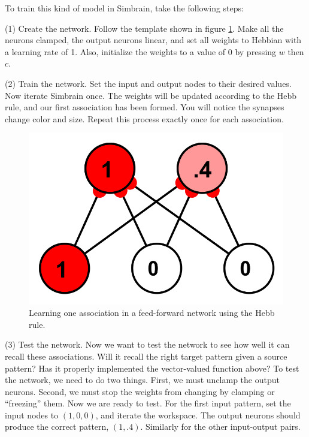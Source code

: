 To train this kind of model in Simbrain, take the following steps:

(1) Create the network. Follow the template shown in figure \ref{ffAssociator}. Make all the neurons clamped, the output neurons linear, and set all weights to Hebbian with a learning rate of 1. Also, initialize the weights to a value of 0 by pressing $w$ then $c$. 

(2) Train the network. Set the input and output nodes to their desired values. Now iterate Simbrain once. The weights will be updated according to the Hebb rule, and our first association has been formed. You will notice the synapses change color and size. Repeat this process exactly once for each association.

\begin{figure}[h]
\centering
\includegraphics[scale=.4]{./images/net-3-2.png}
\caption[Simbrain screenshot.]{Learning one association in a feed-forward network using the Hebb rule.}
\label{ffAssociator}
\end{figure}

(3) Test the network. Now we want to test the network to see how well it can recall these associations. Will it recall the right target pattern given a source pattern? Has it properly implemented the vector-valued function above?  To test the network, we need to do two things. First, we must unclamp the output neurons. Second, we must stop the weights from changing by clamping or ``freezing'' them. Now we are ready to test. For the first input pattern, set the input nodes to $(1,0,0)$, and iterate the workspace. The output neurons should produce the correct pattern, $(1, .4)$. Similarly for the other input-output pairs.

